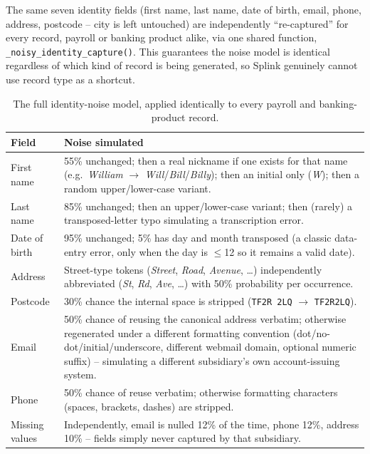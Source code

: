 \documentclass[11pt]{report}
\newcommand{\code}[1]{\lstinline[style=plain]!#1!}
\begin{document}
The same seven identity fields (first name, last name, date of birth, email, phone, address, postcode -- city is left untouched) are independently ``re-captured'' for every record, payroll or banking product alike, via one shared function, \code{_noisy_identity_capture()}. This guarantees the noise model is identical regardless of which kind of record is being generated, so Splink genuinely cannot use record type as a shortcut.

\begin{table}[h]
\centering
\small
\begin{tabular}{@{}p{3.2cm}p{9.9cm}@{}}
\toprule
\textbf{Field} & \textbf{Noise simulated} \\
\midrule
First name & 55\% unchanged; then a real nickname if one exists for that name (e.g.\ \emph{William} $\to$ \emph{Will}/\emph{Bill}/\emph{Billy}); then an initial only (\emph{W}); then a random upper/lower-case variant. \\
Last name & 85\% unchanged; then an upper/lower-case variant; then (rarely) a transposed-letter typo simulating a transcription error. \\
Date of birth & 95\% unchanged; 5\% has day and month transposed (a classic data-entry error, only when the day is $\leq$12 so it remains a valid date). \\
Address & Street-type tokens (\emph{Street}, \emph{Road}, \emph{Avenue}, \ldots) independently abbreviated (\emph{St}, \emph{Rd}, \emph{Ave}, \ldots) with 50\% probability per occurrence. \\
Postcode & 30\% chance the internal space is stripped (\texttt{TF2R 2LQ} $\to$ \texttt{TF2R2LQ}). \\
Email & 50\% chance of reusing the canonical address verbatim; otherwise regenerated under a different formatting convention (dot/no-dot/initial/underscore, different webmail domain, optional numeric suffix) -- simulating a different subsidiary's own account-issuing system. \\
Phone & 50\% chance of reuse verbatim; otherwise formatting characters (spaces, brackets, dashes) are stripped. \\
\midrule
Missing values & Independently, email is nulled 12\% of the time, phone 12\%, address 10\% -- fields simply never captured by that subsidiary. \\
\bottomrule
\end{tabular}
\caption{The full identity-noise model, applied identically to every payroll and banking-product record.}
\end{table}
\end{document}
